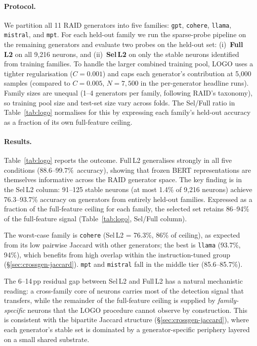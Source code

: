 \documentclass[11pt]{article}
\begin{document}
\paragraph{Protocol.}
We partition all 11 RAID generators into five families: \texttt{gpt}, \texttt{cohere}, \texttt{llama}, \texttt{mistral}, and \texttt{mpt}. For each held-out family we run the sparse-probe pipeline on the remaining generators and evaluate two probes on the held-out set: (i)~\textbf{Full L2} on all 9{,}216 neurons, and (ii)~\textbf{Sel\,L2} on only the stable neurons identified from training families. To handle the larger combined training pool, LOGO uses a tighter regularisation ($C = 0.001$) and caps each generator's contribution at 5{,}000 samples (compared to $C = 0.005$, $N = 7{,}500$ in the per-generator headline runs). Family sizes are unequal (1--4 generators per family, following RAID's taxonomy), so training pool size and test-set size vary across folds. The Sel/Full ratio in Table~\ref{tab:logo} normalises for this by expressing each family's held-out accuracy as a fraction of its own full-feature ceiling.

\paragraph{Results.}
Table~\ref{tab:logo} reports the outcome.
Full\,L2 generalises strongly in all five conditions (88.6--99.7\%\ accuracy),
showing that frozen BERT representations are themselves informative across
the RAID generator space.  The key finding is in the Sel\,L2 column:
91--125 stable neurons (at most 1.4\% of 9{,}216 neurons) achieve
76.3--93.7\% accuracy on generators from entirely held-out families.
Expressed as a fraction of the full-feature ceiling for each family,
the selected set retains 86--94\% of the full-feature signal (Table~\ref{tab:logo},
Sel/Full column).

The worst-case family is \texttt{cohere} (Sel\,L2 = 76.3\%, 86\% of ceiling), as expected from its low pairwise Jaccard with other generators; the best is \texttt{llama} (93.7\%, 94\%), which benefits from high overlap within the instruction-tuned group (§\ref{sec:crossgen-jaccard}). \texttt{mpt} and \texttt{mistral} fall in the middle tier (85.6--85.7\%).

The 6--14\,pp residual gap between Sel\,L2 and Full\,L2 has a natural mechanistic reading: a cross-family core of neurons carries most of the detection signal that transfers, while the remainder of the full-feature ceiling is supplied by \textit{family-specific} neurons that the LOGO procedure cannot observe by construction. This is consistent with the bipartite Jaccard structure (§\ref{sec:crossgen-jaccard}), where each generator's stable set is dominated by a generator-specific periphery layered on a small shared substrate.
\end{document}

